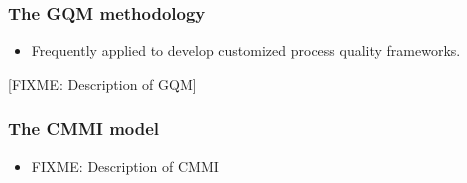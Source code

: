\documentclass{beamer}
\begin{document}

\begin{frame}
 \frametitle{The GQM methodology}
 \begin{itemize}
  \item Frequently applied to develop customized process quality frameworks.
  \end{itemize}
  [FIXME: Description of GQM]

\end{frame}


\begin{frame}
 \frametitle{The CMMI model}
 \begin{itemize}
  \item FIXME: Description of CMMI
  \end{itemize}


\end{frame}

\end{document}
